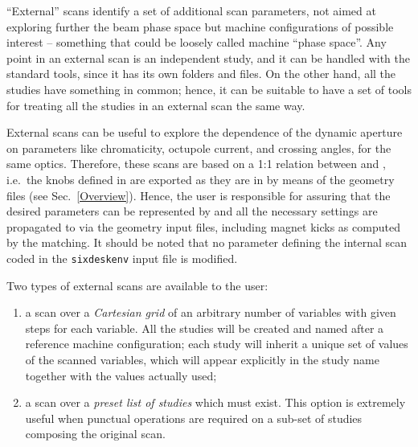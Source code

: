 ``External'' scans identify a set of additional scan parameters, not aimed at
exploring further the beam phase space but machine configurations of possible
interest -- something that could be loosely called machine ``phase space''.
Any point in
an external scan is an independent \SIXDESK{} study, and it can be handled
with the standard tools, since it has its own folders and files.
On the other hand, all the studies have something in common; hence,
it can be suitable to have a set of tools for treating all the
studies in an external scan the same way.

External scans can be useful to explore the dependence of the dynamic
aperture on parameters like chromaticity, octupole current, and crossing
angles, for the same optics. Therefore,
these scans are based on a 1:1 relation between \MADX{} and
\SIXTRACK{}, i.e.~the knobs defined in \MADX{} are exported as they
are in \SIXTRACK{} by means of the geometry files (see Sec.~\ref{Overview}).
Hence, the user is responsible for assuring that the desired parameters can be
represented by \MADX{} and all the necessary settings are propagated
to \SIXTRACK{} via the geometry input files,
including magnet kicks as computed by the \MADX{} matching.
It should be noted that no parameter defining the internal scan
coded in the \texttt{sixdeskenv} input file is modified.

Two types of external scans are available to the user:
\begin{enumerate}
\item a scan over a \emph{Cartesian grid} of an arbitrary number
  of variables with given steps for each variable. All the studies
  will be created and named after a reference machine configuration;
  each study will inherit a unique set of values of the scanned variables,
  which will appear explicitly in the study name
  together with the values actually used;
\item a scan over a \emph{preset list of studies} which must exist.
  This option is extremely useful when punctual operations are
  required on a sub-set of studies composing the original scan.
\end{enumerate}

